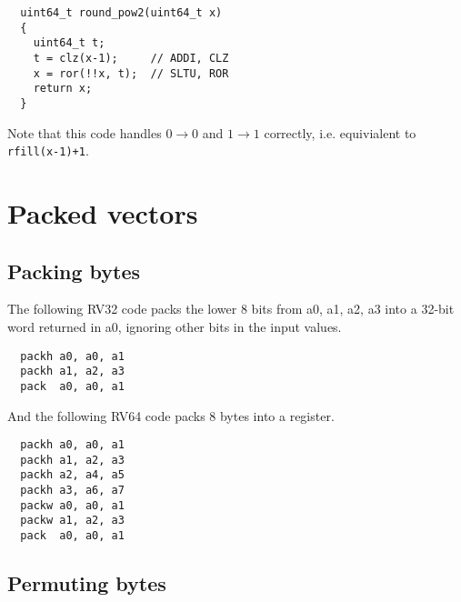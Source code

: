 \begin{minipage}{\linewidth}
\begin{verbatim}
  uint64_t round_pow2(uint64_t x)
  {
    uint64_t t;
    t = clz(x-1);     // ADDI, CLZ
    x = ror(!!x, t);  // SLTU, ROR
    return x;
  }
\end{verbatim}
\end{minipage}

Note that this code handles $0\rightarrow{}0$ and $1\rightarrow{}1$ correctly,
i.e. equivialent to {\tt rfill(x-1)+1}.


\section{Packed vectors}


\subsection{Packing bytes}

The following RV32 code packs the lower 8 bits from a0, a1, a2, a3 into
a 32-bit word returned in a0, ignoring other bits in the input values.

\begin{minipage}{\linewidth}
\begin{verbatim}
  packh a0, a0, a1
  packh a1, a2, a3
  pack  a0, a0, a1
\end{verbatim}
\end{minipage}

And the following RV64 code packs 8 bytes into a register.

\begin{minipage}{\linewidth}
\begin{verbatim}
  packh a0, a0, a1
  packh a1, a2, a3
  packh a2, a4, a5
  packh a3, a6, a7
  packw a0, a0, a1
  packw a1, a2, a3
  pack  a0, a0, a1
\end{verbatim}
\end{minipage}


\subsection{Permuting bytes}

